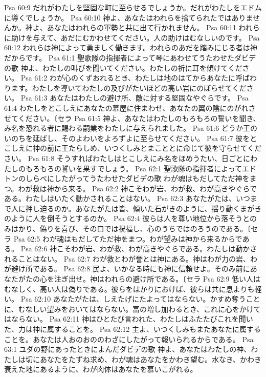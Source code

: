 Psa 60:9  だれがわたしを堅固な町に至らせるでしょうか。だれがわたしをエドムに導くでしょうか。
Psa 60:10  神よ、あなたはわれらを捨てられたではありませんか。神よ、あなたはわれらの軍勢と共に出て行かれません。
Psa 60:11  われらに助けを与えて、あだにむかわせてください。人の助けはむなしいのです。
Psa 60:12  われらは神によって勇ましく働きます。われらのあだを踏みにじる者は神だからです。
Psa 61:1  聖歌隊の指揮者によって琴にあわせてうたわせたダビデの歌 神よ、わたしの叫びを聞いてください。わたしの祈に耳を傾けてください。
Psa 61:2  わが心のくずおれるとき、わたしは地のはてからあなたに呼ばわります。わたしを導いてわたしの及びがたいほどの高い岩にのぼらせてください。
Psa 61:3  あなたはわたしの避け所、敵に対する堅固なやぐらです。
Psa 61:4  わたしをとこしえにあなたの幕屋に住まわせ、あなたの翼の陰にのがれさせてください。〔セラ
Psa 61:5  神よ、あなたはわたしのもろもろの誓いを聞き、み名を恐れる者に賜わる嗣業をわたしに与えられました。
Psa 61:6  どうか王のいのちを延ばし、そのよわいをよろずよに至らせてください。
Psa 61:7  彼をとこしえに神の前に王たらしめ、いつくしみとまこととに命じて彼を守らせてください。
Psa 61:8  そうすればわたしはとこしえにみ名をほめうたい、日ごとにわたしのもろもろの誓いを果すでしょう。
Psa 62:1  聖歌隊の指揮者によってエドトンのしらべにしたがってうたわせたダビデの歌 わが魂はもだしてただ神をまつ。わが救は神から来る。
Psa 62:2  神こそわが岩、わが救、わが高きやぐらである。わたしはいたく動かされることはない。
Psa 62:3  あなたがたは、いつまで人に押し迫るのか。あなたがたは皆、傾いた石がきのように、揺り動くまがきのように人を倒そうとするのか。
Psa 62:4  彼らは人を尊い地位から落そうとのみはかり、偽りを喜び、その口では祝福し、心のうちではのろうのである。〔セラ
Psa 62:5  わが魂はもだしてただ神をまつ。わが望みは神から来るからである。
Psa 62:6  神こそわが岩、わが救、わが高きやぐらである。わたしは動かされることはない。
Psa 62:7  わが救とわが誉とは神にある。神はわが力の岩、わが避け所である。
Psa 62:8  民よ、いかなる時にも神に信頼せよ。そのみ前にあなたがたの心を注ぎ出せ。神はわれらの避け所である。〔セラ
Psa 62:9  低い人はむなしく、高い人は偽りである。彼らをはかりにおけば、彼らは共に息よりも軽い。
Psa 62:10  あなたがたは、しえたげにたよってはならない。かすめ奪うことに、むなしい望みをおいてはならない。富の増し加わるとき、これに心をかけてはならない。
Psa 62:11  神はひとたび言われた、わたしはふたたびこれを聞いた、力は神に属することを。
Psa 62:12  主よ、いつくしみもまたあなたに属することを。あなたは人おのおののわざにしたがって報いられるからである。
Psa 63:1  ユダの野にあったときによんだダビデの歌 神よ、あなたはわたしの神、わたしは切にあなたをたずね求め、わが魂はあなたをかわき望む。水なき、かわき衰えた地にあるように、わが肉体はあなたを慕いこがれる。
